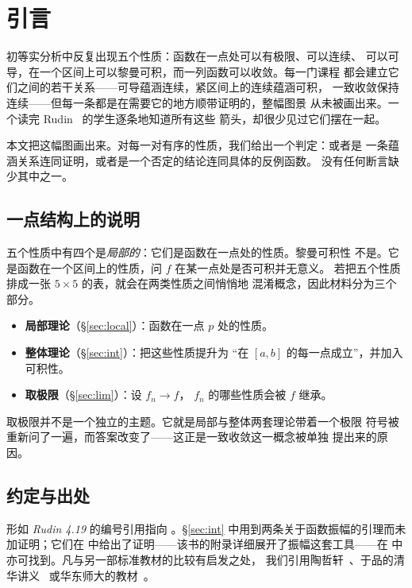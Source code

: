 \section{引言}

初等实分析中反复出现五个性质：函数在一点处可以有极限、可以连续、
可以可导，在一个区间上可以黎曼可积，而一列函数可以收敛。每一门课程
都会建立它们之间的若干关系——可导蕴涵连续，紧区间上的连续蕴涵可积，
一致收敛保持连续——但每一条都是在需要它的地方顺带证明的，整幅图景
从未被画出来。一个读完 Rudin~\cite{rudin} 的学生逐条地知道所有这些
箭头，却很少见过它们摆在一起。

本文把这幅图画出来。对每一对有序的性质，我们给出一个判定：或者是
一条蕴涵关系连同证明，或者是一个否定的结论连同具体的反例函数。
没有任何断言缺少其中之一。

\subsection*{一点结构上的说明}

五个性质中有四个是\emph{局部的}：它们是函数在一点处的性质。黎曼可积性
不是。它是函数在一个区间上的性质，问 $f$ 在某一点处是否可积并无意义。
若把五个性质排成一张 $5\times5$ 的表，就会在两类性质之间悄悄地
混淆概念，因此材料分为三个部分。

\begin{itemize}[leftmargin=1.6em, itemsep=2pt, topsep=4pt]
  \item \textbf{局部理论}（\S\ref{sec:local}）：函数在一点 $p$ 处的性质。
  \item \textbf{整体理论}（\S\ref{sec:int}）：把这些性质提升为
        “在 $[a,b]$ 的每一点成立”，并加入可积性。
  \item \textbf{取极限}（\S\ref{sec:lim}）：设 $f_n \to f$，
        $f_n$ 的哪些性质会被 $f$ 继承。
\end{itemize}

取极限并不是一个独立的主题。它就是局部与整体两套理论带着一个极限
符号被重新问了一遍，而答案改变了——这正是一致收敛这一概念被单独
提出来的原因。

\subsection*{约定与出处}

形如 \emph{Rudin 4.19} 的编号引用指向 \cite{rudin}。\S\ref{sec:int}
中用到两条关于函数振幅的引理而未加证明；它们在 \cite{annotated}
中给出了证明——该书的附录详细展开了振幅这套工具——在
\cite{yupin} 中亦可找到。凡与另一部标准教材的比较有启发之处，
我们引用陶哲轩~\cite{taoI,taoII}、于品的清华讲义~\cite{yupin}
或华东师大的教材~\cite{ecnu}。

